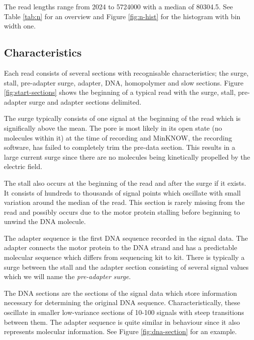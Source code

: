 


The read lengths range from 2024 to \num{5724000} with a median of 80304.5. See Table \ref{tab:n} for an overview and Figure \ref{fig:n-hist} for the histogram with bin width one.






\subsection{Characteristics}

Each read consists of several sections with recognisable characteristics; the surge, stall, pre-adapter surge, adapter, DNA, homopolymer and slow sections. Figure \ref{fig:start-sections} shows the beginning of a typical read with the surge, stall, pre-adapter surge and adapter sections delimited.

The surge typically consists of one signal at the beginning of the read which is significally above the mean. The pore is most likely in its open state (no molecules within it) at the time of recording and MinKNOW, the recording software, has failed to completely trim the pre-data section. This results in a large current surge since there are no molecules being kinetically propelled by the electric field.

The stall also occurs at the beginning of the read and after the surge if it exists. It consists of hundreds to thousands of signal points which oscillate with small variation around the median of the read. This section is rarely missing from the read and possibly occurs due to the motor protein stalling before beginning to unwind the DNA molecule.

The adapter sequence is the first DNA sequence recorded in the signal data. The adapter connects the motor protein to the DNA strand and has a predictable molecular sequence which differs from sequencing kit to kit. There is typically a surge between the stall and the adapter section consisting of several signal values which we will name the \textit{pre-adapter surge}.



The DNA sections are the sections of the signal data which store information necessary for determining the original DNA sequence. Characteristically, these oscillate in smaller low-variance sections of 10-100 signals with steep transitions between them. The adapter sequence is quite similar in behaviour since it also represents molecular information. See Figure \ref{fig:dna-section} for an example.

